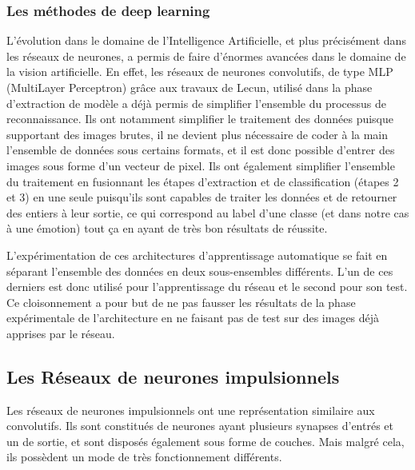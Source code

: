 \documentclass[12pt]{article}
\newcommand{\benjamin}[1]{\textcolor{red}{#1}}
\begin{document}
\subsubsection{Les méthodes de deep learning}

L'évolution dans le domaine de l'Intelligence Artificielle, et plus précisément dans les réseaux de neurones, a permis de faire d'énormes avancées dans le domaine de la vision artificielle. En effet, les réseaux de neurones convolutifs, de type MLP (MultiLayer Perceptron) grâce aux travaux de Lecun\cite{lecun}, utilisé dans la phase d'extraction de modèle a déjà permis de simplifier l'ensemble du processus de reconnaissance. Ils ont notamment simplifier le traitement des données puisque supportant des images brutes, il ne devient plus nécessaire de coder à la main l'ensemble de données sous certains formats, et il est donc possible d'entrer des images sous forme d'un vecteur de pixel. Ils ont également simplifier l'ensemble du traitement en fusionnant les étapes d'extraction et de classification (étapes 2 et 3) en une seule puisqu'ils sont capables de traiter les données et de retourner des entiers à leur sortie, ce qui correspond au label d'une classe (et dans notre cas à une émotion) tout ça en ayant de très bon résultats de réussite.%

L'expérimentation de ces architectures d’apprentissage automatique se fait en séparant l'ensemble des données en deux sous-ensembles différents. L'un de ces derniers est donc utilisé pour l'apprentissage du réseau et le second pour son test. Ce cloisonnement a pour but de ne pas fausser les résultats de la phase expérimentale de l'architecture en ne faisant pas de test sur des images déjà apprises par le réseau.


\subsection{Les Réseaux de neurones impulsionnels}

Les réseaux de neurones impulsionnels ont une représentation similaire aux convolutifs. Ils sont constitués de neurones ayant plusieurs synapses d'entrés et un de sortie, et sont disposés également sous forme de couches. Mais malgré cela, ils possèdent un mode de très fonctionnement différents.
\end{document}
